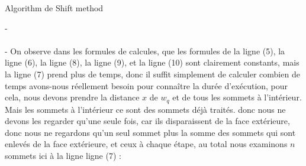 \documentclass[hidelinks,letterpaper,12pt]{article}
\begin{document}
\begin{algorithm}[H]
\label{algorithm}
\caption{Algorithm de Shift method}
\end{algorithm}
\ULforem %
{\color{white}-}
\\ \\
{\color{white}-}
On observe dans les formules de calcules, que les formules de la ligne (5), la ligne (6), la ligne (8), la ligne (9), et la ligne (10) sont clairement constants, mais la ligne (7) prend plus de temps, donc il suffit simplement de calculer combien de temps avons-nous réellement besoin pour connaître la durée d'exécution, pour cela, nous devons prendre la distance $x$ de $w_q$ et de tous les sommets à l'intérieur. Mais les sommets à l'intérieur ce sont des sommets déjà traités. donc nous ne devons les regarder qu'une seule fois, car ils disparaissent de la face extérieure, donc nous ne regardons qu'un seul sommet plus la somme des sommets qui sont enlevés de la face extérieure, et ceux à chaque étape, au total nous examinons $n$ sommets ici à la ligne ligne (7) : 
\end{document}
